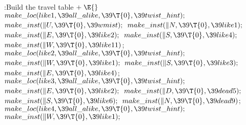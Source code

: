 \Y\B\4:Build the travel table\X${}\mathrel+\E{}$\6
$\\{make\_loc}(\\{like1},\39\\{all\_alike},\39\T{0},\39\\{twist\_hint});{}$\6
${}\\{make\_inst}(\|U,\39\T{0},\39\\{wmist});{}$\6
${}\\{make\_inst}(\|N,\39\T{0},\39\\{like1});{}$\6
${}\\{make\_inst}(\|E,\39\T{0},\39\\{like2});{}$\6
${}\\{make\_inst}(\|S,\39\T{0},\39\\{like4});{}$\6
${}\\{make\_inst}(\|W,\39\T{0},\39\\{like11}){}$;\7
${}\\{make\_loc}(\\{like2},\39\\{all\_alike},\39\T{0},\39\\{twist\_hint});{}$\6
${}\\{make\_inst}(\|W,\39\T{0},\39\\{like1});{}$\6
${}\\{make\_inst}(\|S,\39\T{0},\39\\{like3});{}$\6
${}\\{make\_inst}(\|E,\39\T{0},\39\\{like4}){}$;\7
${}\\{make\_loc}(\\{like3},\39\\{all\_alike},\39\T{0},\39\\{twist\_hint});{}$\6
${}\\{make\_inst}(\|E,\39\T{0},\39\\{like2});{}$\6
${}\\{make\_inst}(\|D,\39\T{0},\39\\{dead5});{}$\6
${}\\{make\_inst}(\|S,\39\T{0},\39\\{like6});{}$\6
${}\\{make\_inst}(\|N,\39\T{0},\39\\{dead9}){}$;\7
${}\\{make\_loc}(\\{like4},\39\\{all\_alike},\39\T{0},\39\\{twist\_hint});{}$\6
${}\\{make\_inst}(\|W,\39\T{0},\39\\{like1});{}$\6

